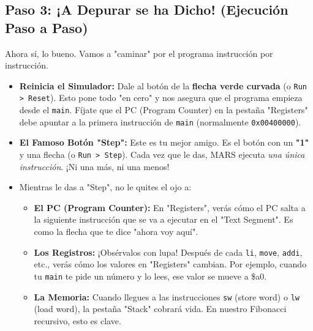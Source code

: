 \documentclass{article}
\begin{document}
\subsection*{Paso 3: ¡A Depurar se ha Dicho! (Ejecución Paso a Paso)}
Ahora sí, lo bueno. Vamos a "caminar" por el programa instrucción por instrucción.
\begin{itemize}
    \item \textbf{Reinicia el Simulador:} Dale al botón de la \textbf{flecha verde curvada} (o \texttt{Run > Reset}). Esto pone todo "en cero" y nos asegura que el programa empieza desde el \texttt{main}. Fíjate que el PC (Program Counter) en la pestaña "Registers" debe apuntar a la primera instrucción de \texttt{main} (normalmente \texttt{0x00400000}).
    \item \textbf{El Famoso Botón "Step":} Este es tu mejor amigo. Es el botón con un \textbf{"1"} y una flecha (o \texttt{Run > Step}). Cada vez que le das, MARS ejecuta \textit{una única instrucción}. ¡Ni una más, ni una menos!
    \item Mientras le das a "Step", no le quites el ojo a:
    \begin{itemize}
        \item \textbf{El PC (Program Counter):} En "Registers", verás cómo el PC salta a la siguiente instrucción que se va a ejecutar en el "Text Segment". Es como la flecha que te dice "ahora voy aquí".
        \item \textbf{Los Registros:} ¡Obsérvalos con lupa! Después de cada \texttt{li}, \texttt{move}, \texttt{addi}, etc., verás cómo los valores en "Registers" cambian. Por ejemplo, cuando tu \texttt{main} te pide un número y lo lees, ese valor se mueve a \$a0.
        \item \textbf{La Memoria:} Cuando llegues a las instrucciones \texttt{sw} (store word) o \texttt{lw} (load word), la pestaña "Stack" cobrará vida. En nuestro Fibonacci recursivo, esto es clave.
    \end{itemize}
\end{itemize}
\end{document}
